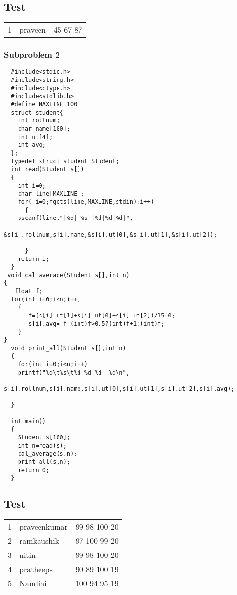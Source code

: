 \documentclass[11pt]{article}
\begin{document}
\subsection*{Test}
\label{sec-2-2}
\begin{center}
\begin{tabular}{rll}
1 & praveen & 45 67 87\\
\end{tabular}
\end{center}

\subsubsection*{Subproblem 2}
\label{sec-2-2-1}
\begin{verbatim}
  #include<stdio.h>
  #include<string.h>
  #include<ctype.h>
  #include<stdlib.h>
  #define MAXLINE 100
  struct student{
    int rollnum;
    char name[100];
    int ut[4];
    int avg; 
  };
  typedef struct student Student;
  int read(Student s[])
  {
    int i=0;
    char line[MAXLINE];
    for( i=0;fgets(line,MAXLINE,stdin);i++)
      {
	sscanf(line,"|%d| %s |%d|%d|%d|",
	       &s[i].rollnum,s[i].name,&s[i].ut[0],&s[i].ut[1],&s[i].ut[2]);

      }
    return i;
  }
 void cal_average(Student s[],int n)
{
   float f;
  for(int i=0;i<n;i++)
    {
       f=(s[i].ut[1]+s[i].ut[0]+s[i].ut[2])/15.0;
       s[i].avg= f-(int)f>0.5?(int)f+1:(int)f;
    }
}
  void print_all(Student s[],int n)
  {
    for(int i=0;i<n;i++)
	printf("%d\t%s\t%d %d %d  %d\n",
		s[i].rollnum,s[i].name,s[i].ut[0],s[i].ut[1],s[i].ut[2],s[i].avg);

  }

  int main()
  {
    Student s[100];
    int n=read(s);
    cal_average(s,n);
    print_all(s,n); 
    return 0;
  }
\end{verbatim}
\subsection*{Test}
\label{sec-2-3}
\begin{center}
\begin{tabular}{rll}
1 & praveenkumar & 99 98 100  20\\
2 & ramkaushik & 97 100 99  20\\
3 & nitin & 99 98 100  20\\
4 & pratheeps & 90 89 100  19\\
5 & Nandini & 100 94 95  19\\
\end{tabular}
\end{center}
\end{document}
